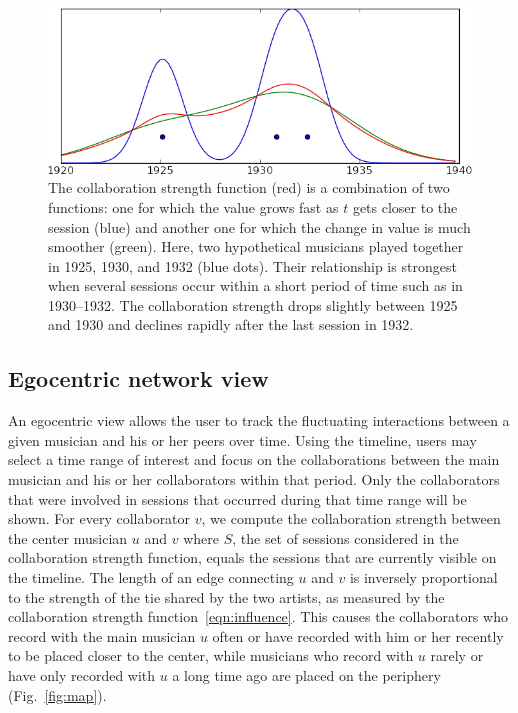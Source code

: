 \documentclass[12pt]{cmuthesis}
\begin{document}
  \begin{figure}
   \includegraphics[width=\linewidth]{influence_plot.png}
   \caption{The collaboration strength function (red) is a combination of two functions:
    one for which  the value grows fast as $t$ gets closer to the session (blue)
    and another one for which the change in value is much smoother (green).
    Here, two hypothetical
    musicians played together in 1925, 1930, and 1932 (blue dots). Their
    relationship is strongest when several sessions occur within a short period of
    time such as in 1930--1932. The collaboration strength drops slightly between
    1925 and 1930 and declines rapidly after the last session in 1932.}
   \label{fig:infl_func}
  \end{figure}


  \subsection{Egocentric network view}

  An egocentric view allows the user to track the fluctuating interactions between
  a given musician and his or her peers over time. Using the timeline, users may
  select a time range of interest and focus on the collaborations between the main
  musician and his or her collaborators within that period. Only the collaborators
  that were involved in sessions that occurred during that time range will be
  shown. For every collaborator $v$, we compute the collaboration strength between
  the center musician $u$ and $v$ where $S$, the set of sessions considered in the
  collaboration strength function, equals the sessions that are currently visible on
  the timeline. The length of an edge connecting $u$ and $v$ is inversely
  proportional to the strength of the tie shared by the two artists, as measured
  by the collaboration strength function~\eqref{eqn:influence}. This causes the
  collaborators who record with the main musician $u$ often or have recorded with
  him or her recently to be placed closer to the center, while musicians who
  record with $u$ rarely or have only recorded with $u$ a long time ago are placed
  on the periphery (Fig.~\ref{fig:map}).
\end{document}
